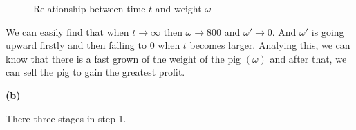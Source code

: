 \documentclass{report}
\begin{document}
\begin{spacing}{1.3541667}
\begin{figure}[htbp]
    \centering
    \hspace{0.1in}
    \caption{Relationship between time $t$ and weight $\omega$}
\end{figure}

We can easily find that when $t \to \infty$ then $\omega \to 800$ and $\omega '\to 0$. 
And $\omega'$ is going upward firstly and then falling to 0 when $t$ becomes larger. 
Analying this, we can know that there is a fast grown of the weight of the pig $(\omega)$ 
and after that, we can sell the pig to gain the greatest profit. 

\newpage
{\bf (b)}\par
\hspace{-1.5em}{\bf Step 1. Ask the question}\par 
There three stages in step 1.


\end{spacing}
\end{document}
